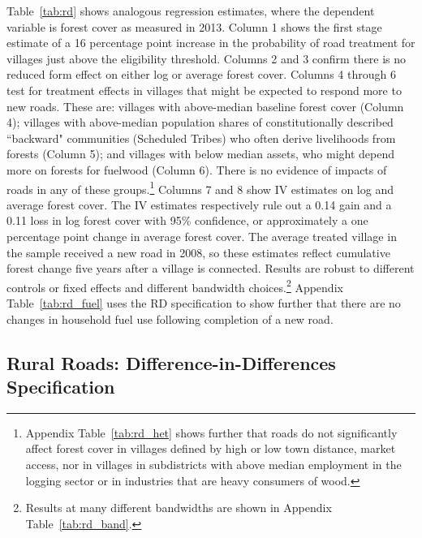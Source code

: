 Table~\ref{tab:rd} shows analogous regression estimates, where the
dependent variable is forest cover as measured in 2013.  Column 1
shows the first stage estimate of a 16 percentage point increase in
the probability of road treatment for villages just above the
eligibility threshold. Columns 2 and 3 confirm there is no reduced
form effect on either log or average forest cover. Columns 4 through 6
test for treatment effects in villages that might be expected to
respond more to new roads. These are: villages with above-median
baseline forest cover (Column 4); villages with above-median
population shares of constitutionally described ``backward"
communities (Scheduled Tribes) who often derive livelihoods from
forests (Column 5); and villages with below median assets, who might
depend more on forests for fuelwood (Column 6). There is no evidence
of impacts of roads in any of these groups.\footnote{Appendix
  Table~\ref{tab:rd_het} shows further that roads do not significantly
  affect forest cover in villages defined by high or low town
  distance, market access, nor in villages in subdistricts with above
  median employment in the logging sector or in industries that are
  heavy consumers of wood.}  Columns 7 and 8 show IV estimates on log
and average forest cover. The IV estimates respectively rule out a
0.14 gain and a 0.11 loss in log forest cover with 95\% confidence, or
approximately a one percentage point change in average forest
cover. The average treated village in the sample received a new road
in 2008, so these estimates reflect cumulative forest change five
years after a village is connected.  Results are robust to different
controls or fixed effects and different bandwidth
choices.\footnote{Results at many different bandwidths are shown in
  Appendix Table~\ref{tab:rd_band}.} Appendix Table~\ref{tab:rd_fuel}
uses the RD specification to show further that there are no changes in
household fuel use following completion of a new road.

\subsection{Rural Roads: Difference-in-Differences Specification}

